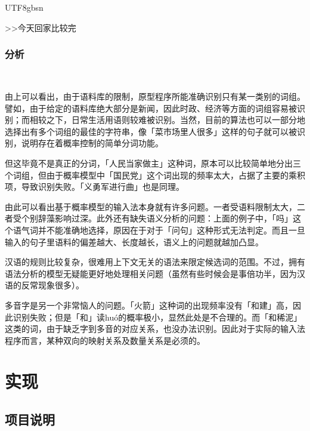 \documentclass{article}
\newenvironment{itemizedot}{\begin{itemize} \renewcommand{\labelitemi}{$\bullet$}\renewcommand{\labelitemii}{$\bullet$}\renewcommand{\labelitemiii}{$\bullet$}\renewcommand{\labelitemiv}{$\bullet$}}{\end{itemize}}
\newenvironment{tmindent}{\begin{tmparmod}{1.5em}{0pt}{0pt}}{\end{tmparmod}}
\newenvironment{tmparmod}[3]{\begin{list}{}{\setlength{\topsep}{0pt}\setlength{\leftmargin}{#1}\setlength{\rightmargin}{#2}\setlength{\parindent}{#3}\setlength{\listparindent}{\parindent}\setlength{\itemindent}{\parindent}\setlength{\parsep}{\parskip}} \item[]}{\end{list}}
\begin{document}
\begin{CJK*}{UTF8}{gbsn}
\begin{tmindent}
\begin{tmbothlined}
\begin{itemizedot}
      >>今天回家比较完
    \end{itemizedot}
  \end{tmbothlined}
\end{tmindent}


\subsubsection{分析}

\begin{tmindent}
  \
  
  由上可以看出，由于语料库的限制，原型程序所能准确识别只有某一类别的词组。譬如，由于给定的语料库绝大部分是新闻，因此时政、经济等方面的词组容易被识别；而相较之下，日常生活用语则较难被识别。当然，目前的算法也可以一部分地选择出有多个词组的最佳的字符串，像「菜市场里人很多」这样的句子就可以被识别，说明存在着概率控制的简单分词功能。
  
  但这毕竟不是真正的分词，「人民当家做主」这种词，原本可以比较简单地分出三个词组，但由于概率模型中「国民党」这个词出现的频率太大，占据了主要的乘积项，导致识别失败。「义勇军进行曲」也是同理。
  
  由此可以看出基于概率模型的输入法本身就有许多问题。一者受语料限制太大，二者受个别辞藻影响过深。此外还有缺失语义分析的问题：上面的例子中，「吗」这个语气词并不能准确地选择，原因在于对于「问句」这种形式无法判定。而且一旦输入的句子里语料的偏差越大、长度越长，语义上的问题就越加凸显。
  
  汉语的规则比较复杂，很难用上下文无关的语法来限定候选词的范围。不过，拥有语法分析的模型无疑能更好地处理相关问题（虽然有些时候会是事倍功半，因为汉语的反常现象很多）。
  
  多音字是另一个非常恼人的问题。「火箭」这种词的出现频率没有「和建」高，因此识别失败；但是「和」读huó的概率极小，显然此处是不合理的。而「和稀泥」这类的词，由于缺乏字到多音的对应关系，也没办法识别。因此对于实际的输入法程序而言，某种双向的映射关系及数量关系是必须的。
\end{tmindent}

\section{实现}

\subsection{项目说明}

\begin{tmindent}
  \
  

\end{tmindent}
\end{CJK*}
\end{document}
